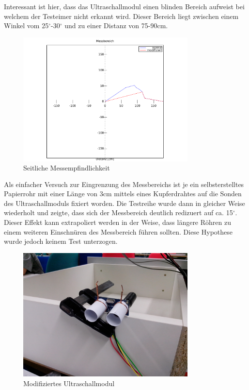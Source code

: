 Interessant ist hier, dass das Ultraschallmodul einen blinden Bereich aufweist
bei welchem der Testeimer nicht erkannt wird. Dieser Bereich liegt zwischen 
einem Winkel vom 25$^\circ$-30$^\circ$ und zu einer Distanz von 75-90cm.

\begin{figure}[h!]
	\centering
	\includegraphics[width=0.8\textwidth]{../../fig/hc-sr04_range.pdf}
	\caption{Seitliche Messempfindlichkeit}
	\label{fig:sideresponse}
\end{figure}

Als einfacher Versuch zur Eingrenzung des Messbereichs ist je ein 
selbsterstelltes Papierrohr mit einer Länge von 3cm mittels eines 
Kupferdrahtes auf die Sonden des Ultraschallmoduls fixiert worden. 
Die Testreihe wurde dann in gleicher Weise wiederholt und zeigte, dass
sich der Messbereich deutlich redizuert auf ca. 15$^\circ$. Dieser Effekt 
kann extrapoliert werden in der Weise, dass längere Röhren zu einem weiteren 
Einschnüren des Messbereich führen sollten. Diese Hypothese wurde jedoch
keinem Test unterzogen.

\begin{figure}[h!]
	\centering
	\includegraphics[width=0.8\textwidth]{../../fig/HC-SR04_08.jpg}
	\caption{Modifiziertes Ultraschallmodul}
\end{figure}

